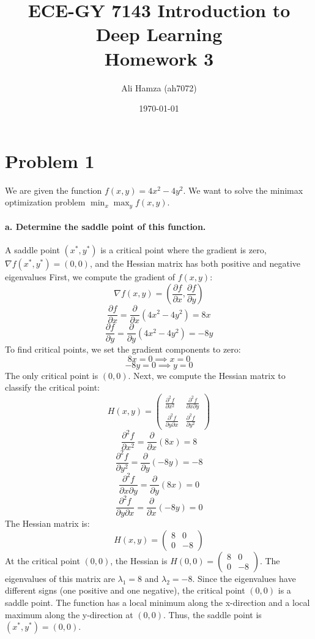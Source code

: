 \documentclass{article}
\title{ECE-GY 7143 Introduction to Deep Learning \\ \Large Homework 3}
\author{Ali Hamza (ah7072)}
\date{\today}
\begin{document}
\maketitle

\section*{Problem 1}
We are given the function $f(x, y) = 4x^2 - 4y^2$. We want to solve the minimax optimization problem $\min_x \max_y f(x, y)$.

\paragraph{a. Determine the saddle point of this function.}

A saddle point $(x^*, y^*)$ is a critical point where the gradient is zero, $\nabla f(x^*, y^*) = (0, 0)$, and the Hessian matrix has both positive and negative eigenvalues First, we compute the gradient of $f(x, y)$:
$$ \nabla f(x, y) = \left( \frac{\partial f}{\partial x}, \frac{\partial f}{\partial y} \right) $$
$$ \frac{\partial f}{\partial x} = \frac{\partial}{\partial x}(4x^2 - 4y^2) = 8x $$
$$ \frac{\partial f}{\partial y} = \frac{\partial}{\partial y}(4x^2 - 4y^2) = -8y $$
To find critical points, we set the gradient components to zero:
$$ 8x = 0 \implies x = 0 $$
$$ -8y = 0 \implies y = 0 $$
The only critical point is $(0, 0)$. Next, we compute the Hessian matrix to classify the critical point:
$$ H(x, y) = \begin{pmatrix} \frac{\partial^2 f}{\partial x^2} & \frac{\partial^2 f}{\partial x \partial y} \\ \frac{\partial^2 f}{\partial y \partial x} & \frac{\partial^2 f}{\partial y^2} \end{pmatrix} $$
$$ \frac{\partial^2 f}{\partial x^2} = \frac{\partial}{\partial x}(8x) = 8 $$
$$ \frac{\partial^2 f}{\partial y^2} = \frac{\partial}{\partial y}(-8y) = -8 $$
$$ \frac{\partial^2 f}{\partial x \partial y} = \frac{\partial}{\partial y}(8x) = 0 $$
$$ \frac{\partial^2 f}{\partial y \partial x} = \frac{\partial}{\partial x}(-8y) = 0 $$
The Hessian matrix is:
$$ H(x, y) = \begin{pmatrix} 8 & 0 \\ 0 & -8 \end{pmatrix} $$
At the critical point $(0, 0)$, the Hessian is $H(0, 0) = \begin{pmatrix} 8 & 0 \\ 0 & -8 \end{pmatrix}$. The eigenvalues of this matrix are $\lambda_1 = 8$ and $\lambda_2 = -8$. Since the eigenvalues have different signs (one positive and one negative), the critical point $(0, 0)$ is a saddle point. The function has a local minimum along the x-direction and a local maximum along the y-direction at $(0, 0)$. Thus, the saddle point is $(x^*, y^*) = (0, 0)$.
\end{document}
